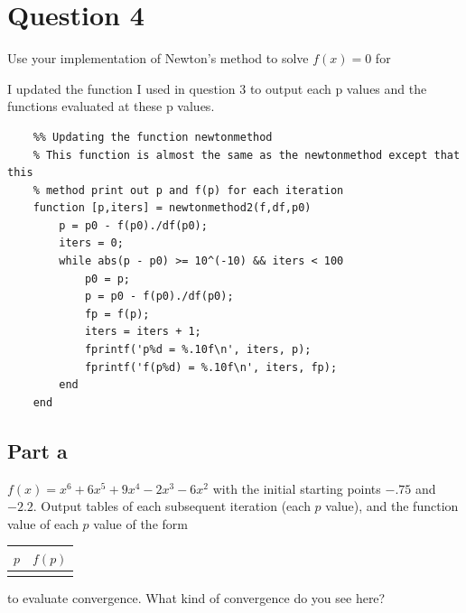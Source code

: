 \section{Question 4}

\begin{question}
    Use your implementation of Newton's method to solve $f(x) = 0$ for 
\end{question}

I updated the function I used in question $3$ to output each p values and the functions evaluated at these p values.

\begin{verbatim}
    %% Updating the function newtonmethod
    % This function is almost the same as the newtonmethod except that this
    % method print out p and f(p) for each iteration
    function [p,iters] = newtonmethod2(f,df,p0)
        p = p0 - f(p0)./df(p0);
        iters = 0;
        while abs(p - p0) >= 10^(-10) && iters < 100
            p0 = p;
            p = p0 - f(p0)./df(p0);
            fp = f(p);
            iters = iters + 1;
            fprintf('p%d = %.10f\n', iters, p);
            fprintf('f(p%d) = %.10f\n', iters, fp);
        end
    end
\end{verbatim}

\subsection{Part a}

\begin{question}
    \item $f(x) = x^6+6x^5+9x^4-2x^3-6x^2$ with the initial starting points $-.75$ and $-2.2$. Output tables of each subsequent iteration (each $p$ value), and the function value of each $p$ value of the form \begin{tabular}{c|c} $p$ & $f(p)$ \\ \hline & \end{tabular} to evaluate convergence. What kind of convergence do you see here? 

\end{question}
    
